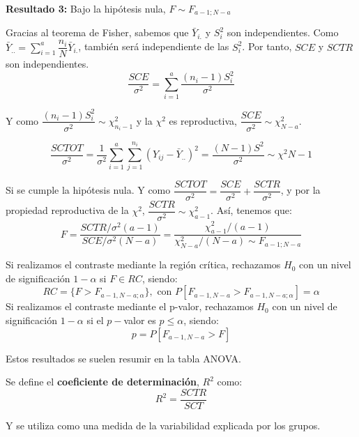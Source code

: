 \textbf{Resultado 3:} Bajo la hip\'otesis nula, $F\sim F_{a-1;N-a}$

Gracias al teorema de Fisher, sabemos que $\bar{Y}_{i.}$ y $S_i^2$ son independientes. Como $\bar{Y}_{..}=\sum_{i=1}^a\dfrac{n_i}{N}\bar{Y}_{i.}$, tambi\'en ser\'a independiente de las $S_i^2$. Por tanto, $SCE$ y $SCTR$ son independientes.
\[\dfrac{SCE}{\sigma^2}=\sum_{i=1}^a\dfrac{(n_i-1)S_i^2}{\sigma^2}\]

Y como $\dfrac{(n_i-1)S_i^2}{\sigma^2}\sim\chi^2_{n_i-1}$ y la $\chi^2$ es reproductiva, 
$\dfrac{SCE}{\sigma^2}\sim\chi^2_{N-a}$.

\[\dfrac{SCTOT}{\sigma^2}=\dfrac{1}{\sigma^2}\sum_{i=1}^a\sum_{j=1}^{n_i}(Y_{ij}-\bar{Y}_{..})^2=\dfrac{(N-1)S^2}{\sigma^2}\sim\chi^2{N-1}\]

Si se cumple la hip\'otesis nula. Y como $\dfrac{SCTOT}{\sigma^2}=\dfrac{SCE}{\sigma^2}+\dfrac{SCTR}{\sigma^2}$, y por la propiedad reproductiva de la $\chi^2$, $\dfrac{SCTR}{\sigma^2}\sim\chi^2_{a-1}$. As\'i, tenemos que:
\[F=\dfrac{SCTR/\sigma^2(a-1)}{SCE/\sigma^2(N-a)}=\dfrac{\chi^2_{a-1}/(a-1)}{\chi^2_{N-a}/(N-a)\sim F_{a-1;N-a}}\]

Si realizamos el contraste mediante la regi\'on cr\'itica, rechazamos $H_0$ con un nivel de significaci\'on $1-\alpha$ si $F\in RC$, siendo:
\[RC=\{F>F_{a-1,N-a;\alpha}\}, \text{ con } P[F_{a-1,N-a}>F_{a-1,N-a;\alpha}]=\alpha\]
Si realizamos el contraste mediante el p-valor, rechazamos $H_0$ con un nivel de significaci\'on $1-\alpha$ si el $p-$valor es $p\leq\alpha$, siendo:
\[p=P[F_{a-1,N-a}>F]\]

Estos resultados se suelen resumir en la tabla ANOVA.

Se define el \textbf{coeficiente de determinaci\'on}, $R^2$ como:
\[R^2=\dfrac{SCTR}{SCT}\]

Y se utiliza como una medida de la variabilidad explicada por los grupos.

